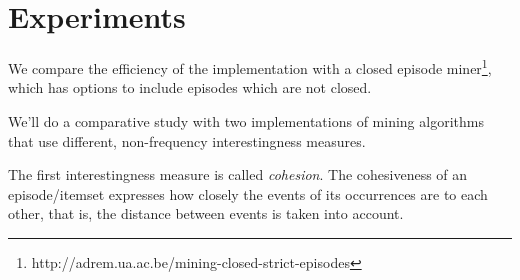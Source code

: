 \chapter{Experiments}

We compare the efficiency of the implementation with a closed episode miner\footnote{http://adrem.ua.ac.be/mining-closed-strict-episodes}, which has options to include episodes which are not closed.

We'll do a comparative study with two implementations of mining algorithms that use different, non-frequency interestingness measures.

The first interestingness measure is called \emph{cohesion}. The cohesiveness of an episode/itemset expresses how closely the events of its occurrences are to each other, that is, the distance between events is taken into account.
